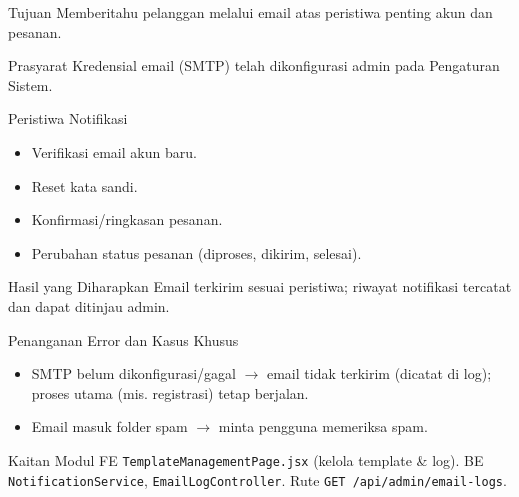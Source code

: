 
\begin{flowsection}{Tujuan}
Memberitahu pelanggan melalui email atas peristiwa penting akun dan pesanan.
\end{flowsection}

\begin{flowsection}{Prasyarat}
Kredensial email (SMTP) telah dikonfigurasi admin pada Pengaturan Sistem.
\end{flowsection}

\begin{flowsection}{Peristiwa Notifikasi}
\begin{itemize}
  \item Verifikasi email akun baru.
  \item Reset kata sandi.
  \item Konfirmasi/ringkasan pesanan.
  \item Perubahan status pesanan (diproses, dikirim, selesai).
\end{itemize}
\end{flowsection}


\begin{flowsection}{Hasil yang Diharapkan}
Email terkirim sesuai peristiwa; riwayat notifikasi tercatat dan dapat ditinjau
admin.
\end{flowsection}

\begin{flowsection}{Penanganan Error dan Kasus Khusus}
\begin{itemize}
  \item SMTP belum dikonfigurasi/gagal $\rightarrow$ email tidak terkirim (dicatat di log);
        proses utama (mis. registrasi) tetap berjalan.
  \item Email masuk folder spam $\rightarrow$ minta pengguna memeriksa spam.
\end{itemize}
\end{flowsection}

\begin{flowsection}{Kaitan Modul}
FE \texttt{TemplateManagementPage.jsx} (kelola template \& log). BE
\texttt{NotificationService}, \texttt{EmailLogController}. Rute
\texttt{GET /api/admin/email-logs}.
\end{flowsection}

